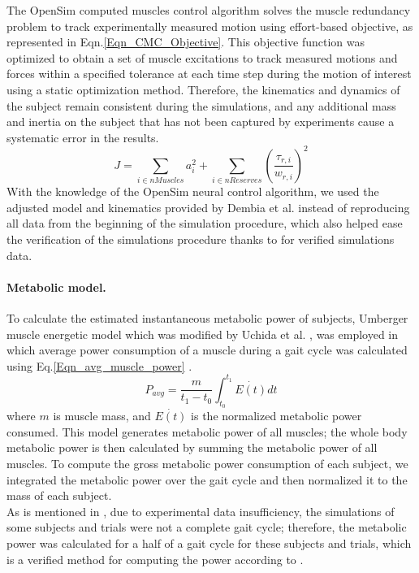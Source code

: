 \documentclass[10pt,letterpaper]{article}
\begin{document}
The OpenSim computed muscles control algorithm solves the muscle redundancy problem to track experimentally measured motion using effort-based objective, as represented in Eqn.\eqref{Eqn_CMC_Objective}. This objective function was optimized to obtain a set of muscle excitations to track measured motions and forces within a specified tolerance at each time step during the motion of interest using a static optimization method\cite{92}. Therefore, the kinematics and dynamics of the subject remain consistent during the simulations, and any additional mass and inertia on the subject that has not been captured by experiments cause a systematic error in the results.\\
\begin{equation}\label{Eqn_CMC_Objective}
J = \sum_{i\in nMuscles} a_{i}^{2} + \sum_{i \in nReserves} (\frac{\tau_{r,i}}{w_{r,i}})^2
\end{equation}
With the knowledge of the OpenSim neural control algorithm, we used the adjusted model and kinematics provided by Dembia et al.\cite{93} instead of reproducing all data from the beginning of the simulation procedure, which also helped ease the verification of the simulations procedure thanks to \cite{93} for verified simulations data.\\
\paragraph*{Metabolic model.} To calculate the estimated instantaneous metabolic power of subjects, Umberger \cite{105} muscle energetic model which was modified by Uchida et al. \cite{106}, was employed in which average power consumption of a muscle during a gait cycle was calculated using Eq.\eqref{Eqn_avg_muscle_power} \cite{106}.\\
\begin{equation}\label{Eqn_avg_muscle_power}
	P_{avg} = \frac{m}{t_1 - t_0}\int_{t_0}^{t_1} \dot{E(t)} dt
\end{equation}
where $m$ is muscle mass, and $\dot{E(t)}$ is the normalized metabolic power consumed. This model generates metabolic power of all muscles; the whole body metabolic power is then calculated by summing the metabolic power of all muscles\cite{106}. To compute the gross metabolic power consumption of each subject, we integrated the metabolic power over the gait cycle and then normalized it to the mass of each subject.\\
As is mentioned in \cite{93}, due to experimental data insufficiency, the simulations of some subjects and trials were not a complete gait cycle; therefore, the metabolic power was calculated for a half of a gait cycle for these subjects and trials, which is a verified method for computing the power according to \cite{93}. \\
\end{document}

